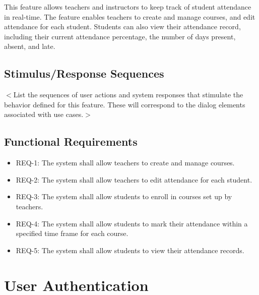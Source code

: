 \documentclass{scrreprt}
\begin{document}
This feature allows teachers and instructors to keep track of student attendance in real-time.
The feature enables teachers to create and manage courses, and edit attendance for each student.
Students can also view their attendance record, including their current attendance percentage, the number of days present, absent, and late.
\subsection{Stimulus/Response Sequences}
$<$List the sequences of user actions and system responses that stimulate the 
behavior defined for this feature. These will correspond to the dialog elements 
associated with use cases.$>$

\subsection{Functional Requirements}
\begin{itemize}
    \item REQ-1: The system shall allow teachers to create and manage courses.
    \item REQ-2: The system shall allow teachers to edit attendance for each student.
    \item REQ-3: The system shall allow students to enroll in courses set up by teachers. 
    \item REQ-4: The system shall allow students to mark their attendance within a specified time frame for each course.
    \item REQ-5: The system shall allow students to view their attendance records.
\end{itemize}



\section{User Authentication}
\end{document}
